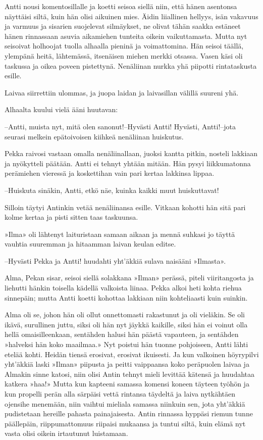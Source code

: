 \documentclass[a4paper,finnish,12pt]{scrartcl}
\begin{document}
Antti nousi komentosillalle ja koetti seisoa siellä niin, että hänen
asentonsa näyttäisi siltä, kuin hän olisi aikuinen mies. Äidin
liiallinen hellyys, isän vakavuus ja varmuus ja sisarien suojelevat
silmäykset, ne olivat tähän saakka estäneet hänen rinnassaan asuvia
aikamiehen tunteita oikein vaikuttamasta. Mutta nyt seisoivat holhoojat
tuolla alhaalla pieninä ja voimattomina. Hän seisoi täällä, ylempänä
heitä, lähtemässä, itsenäisen miehen merkki otsassa. Vasen käsi oli
taskussa ja oikea poveen pistettynä. Nenäliinan nurkka yhä piipotti
rintataskusta esille.

Laivaa siirrettiin ulommas, ja juopa laidan ja laivasillan välillä
suureni yhä.

Alhaalta kuului vielä ääni huutavan:

--Antti, muista nyt, mitä olen sanonut!--Hyvästi Antti! Hyvästi,
Antti!--jota seurasi melkein epätoivoisen kiihkeä nenäliinan huiskutus.

Pekka raivosi vastaan omalla nenäliinallaan, juoksi kantta pitkin,
nosteli lakkiaan ja nyökytteli päätään. Antti ei tehnyt yhtään mitään.
Hän pysyi liikkumatonna perämiehen vieressä ja koskettihan vain pari
kertaa lakkinsa lippaa.

--Huiskuta sinäkin, Antti, etkö näe, kuinka kaikki muut huiskuttavat!

Silloin täytyi Antinkin vetää nenäliinansa esille. Vitkaan kohotti hän
sitä pari kolme kertaa ja pisti sitten taas taskuunsa.

»Ilma» oli lähtenyt laituristaan samaan aikaan ja mennä suhkasi jo
täyttä vauhtia suuremman ja hitaamman laivan keulan editse.

--Hyvästi Pekka ja Antti! huudahti yht'äkkiä sulava naisääni »Ilmasta».

Alma, Pekan sisar, seisoi siellä solakkana »Ilman» perässä, piteli
viiritangosta ja liehutti hänkin toisella kädellä valkoista liinaa.
Pekka alkoi heti kohta riehua sinnepäin; mutta Antti koetti kohottaa
lakkiaan niin kohteliaasti kuin suinkin.

Alma oli se, johon hän oli ollut onnettomasti rakastunut ja oli
vieläkin. Se oli ikävä, surullinen juttu, siksi oli hän nyt jäykkä
kaikille, siksi hän ei voinut olla hellä omaisilleenkaan, sentähden
halusi hän päästä vapauteen, ja sentähden »halveksi hän koko maailmaa.»
Nyt poistui hän tuonne pohjoiseen, Antti lähti etelää kohti. Heidän
tiensä erosivat, erosivat ikuisesti. Ja kun valkoinen höyrypilvi
yht'äkkiä laski »Ilman» piipusta ja peitti vaippaansa koko peräpuolen
laivaa ja Almakin sinne katosi, niin olisi Antin tehnyt mieli levittää
kätensä ja huudahtaa katkera »haa!» Mutta kun kapteeni samassa komensi
koneen täyteen työhön ja kun propelli perän alla särpäisi vettä
rintansa täydeltä ja laiva nytkähtäen ojensihe menemään, niin vaihtui
mieliala samassa niinkuin sen, jota yht'äkkiä pudistetaan hereille
pahasta painajaisesta. Antin rinnassa hyppäsi riemun tunne päällepäin,
riippumattomuus riipaisi mukaansa ja tuntui siltä, kuin elämä nyt vasta
olisi oikein irtautunut luistamaan.
\end{document}
